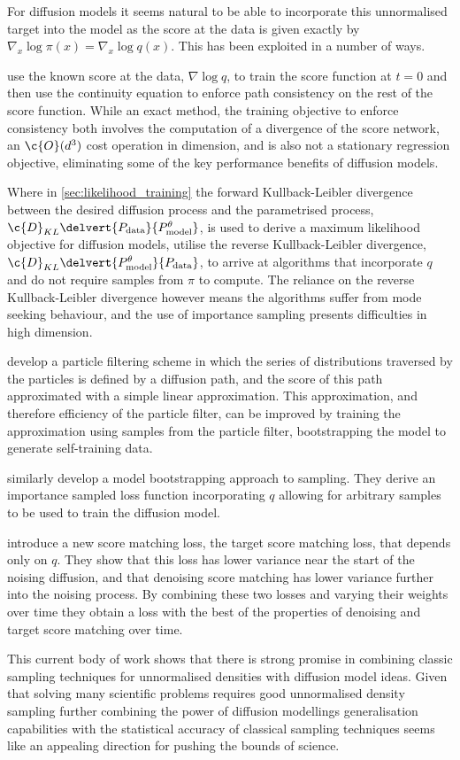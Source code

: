 For diffusion models it seems natural to be able to incorporate this unnormalised target into the model as the score at the data is given exactly by \(\nabla_x \log \pi(x) = \nabla_x \log q(x)\).
This has been exploited in a number of ways.

\textcite{zheng2023predictingequilibriumdistributionsmolecular} use the known score at the data, \(\nabla \log q\), to train the score function at \(t=0\) and then use the continuity equation to enforce path consistency on the rest of the score function.
While an exact method, the training objective to enforce consistency both involves the computation of a divergence of the score network, an \(\c{O}(d^3)\) cost operation in dimension, and is also not a stationary regression objective, eliminating some of the key performance benefits of diffusion models.

Where in \cref{sec:likelihood_training} the forward Kullback-Leibler divergence between the desired diffusion process and the parametrised process, \(\c{D}_{KL}\delvert{P_\text{data}}{P^\theta_{\text{model}}}\), is used to derive a maximum likelihood objective for diffusion models, \textcite{zhang2021path,vargas2021solving} utilise the reverse Kullback-Leibler divergence, \(\c{D}_{KL}\delvert{P^\theta_{\text{model}}}{P_\text{data}}\), to arrive at algorithms that incorporate \(q\) and do not require samples from \(\pi\) to compute.
The reliance on the reverse Kullback-Leibler divergence however means the algorithms suffer from mode seeking behaviour, and the use of importance sampling presents difficulties in high dimension.

\textcite{phillips2024particle} develop a particle filtering scheme in which the series of distributions traversed by the particles is defined by a diffusion path, and the score of this path approximated with a simple linear approximation.
This approximation, and therefore efficiency of the particle filter, can be improved by training the approximation using samples from the particle filter, bootstrapping the model to generate self-training data.

\textcite{akhound2024iterated} similarly develop a model bootstrapping approach to sampling.
They derive an importance sampled loss function incorporating \(q\) allowing for arbitrary samples to be used to train the diffusion model.

\textcite{de2024target} introduce a new score matching loss, the target score matching loss, that depends only on \(q\).
They show that this loss has lower variance near the start of the noising diffusion, and that denoising score matching has lower variance further into the noising process. 
By combining these two losses and varying their weights over time they obtain a loss with the best of the properties of denoising and target score matching over time.

This current body of work shows that there is strong promise in combining classic sampling techniques for unnormalised densities with diffusion model ideas.
Given that solving many scientific problems requires good unnormalised density sampling further combining the power of diffusion modellings generalisation capabilities with the statistical accuracy of classical sampling techniques seems like an appealing direction for pushing the bounds of science.